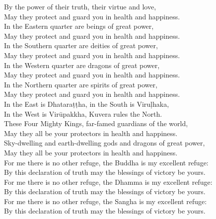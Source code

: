 \begin{onechants}
By the power of their truth, their virtue and love,\\
May they protect and guard you in health and happiness.\\
In the Eastern quarter are beings of great power,\\
May they protect and guard you in health and happiness.\\
In the Southern quarter are deities of great power,\\
May they protect and guard you in health and happiness.\\
In the Western quarter are dragons of great power,\\
May they protect and guard you in health and happiness.\\
In the Northern quarter are spirits of great power,\\
May they protect and guard you in health and happiness.\\
In the East is Dhataraṭṭha, in the South is Viruḷhaka,\\
In the West is Virūpakkha, Kuvera rules the North.\\
These Four Mighty Kings, far-famed guardians of the world,\\
May they all be your protectors in health and happiness.\\
Sky-dwelling and earth-dwelling gods and dragons of great power,\\
May they all be your protectors in health and happiness.\\
For me there is no other refuge, the Buddha is my excellent refuge:\\
By this declaration of truth may the blessings of victory be yours.\\
For me there is no other refuge, the Dhamma is my excellent refuge:\\
By this declaration of truth may the blessings of victory be yours.\\
For me there is no other refuge, the Sangha is my excellent refuge:\\
By this declaration of truth may the blessings of victory be yours.\\
\end{onechants}

\clearpage

\paliText
\enlargethispage{2\baselineskip}
\savenotes


